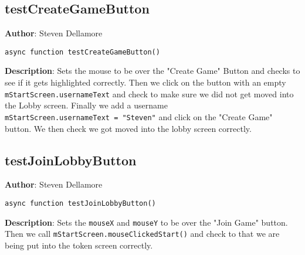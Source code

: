 \documentclass[12pt]{article}
\begin{document}
\subsection{testCreateGameButton}
\textbf{Author}: Steven Dellamore 
\vspace*{1\baselineskip}
\begin{lstlisting}
async function testCreateGameButton()
\end{lstlisting} 
\vspace*{1\baselineskip}
\textbf{Description}: Sets the mouse to be over the "Create Game" Button and checks to see if it gets highlighted correctly. Then we click on the button with an empty \texttt{mStartScreen.usernameText} and check to make sure we did not get moved into the Lobby screen. Finally we add a username \\ \texttt{mStartScreen.usernameText = "Steven"} and click on the "Create Game" button. We then check we got moved into the lobby screen correctly. 



\subsection{testJoinLobbyButton}
\textbf{Author}: Steven Dellamore 
\vspace*{1\baselineskip}
\begin{lstlisting}
async function testJoinLobbyButton()
\end{lstlisting} 
\vspace*{1\baselineskip}
\textbf{Description}: Sets the \texttt{mouseX} and \texttt{mouseY} to be over the "Join Game" button. Then we call \texttt{mStartScreen.mouseClickedStart()} and check to that we are being put into the token screen correctly. 
\end{document}
